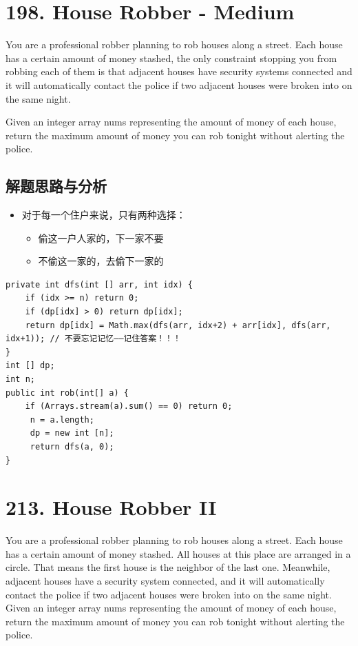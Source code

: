 \documentclass[9pt, b5paaper]{book}
\begin{document}
\section{198. House Robber - Medium}
\label{sec-2-2}
You are a professional robber planning to rob houses along a street. Each house has a certain amount of money stashed, the only constraint stopping you from robbing each of them is that adjacent houses have security systems connected and it will automatically contact the police if two adjacent houses were broken into on the same night.

Given an integer array nums representing the amount of money of each house, return the maximum amount of money you can rob tonight without alerting the police.
\subsection{解题思路与分析}
\label{sec-2-2-1}
\begin{itemize}
\item 对于每一个住户来说，只有两种选择：
\begin{itemize}
\item 偷这一户人家的，下一家不要
\item 不偷这一家的，去偷下一家的
\end{itemize}
\end{itemize}
\begin{verbatim}
private int dfs(int [] arr, int idx) {
    if (idx >= n) return 0;
    if (dp[idx] > 0) return dp[idx];
    return dp[idx] = Math.max(dfs(arr, idx+2) + arr[idx], dfs(arr, idx+1)); // 不要忘记记忆——记住答案！！！
}
int [] dp;
int n;
public int rob(int[] a) {
    if (Arrays.stream(a).sum() == 0) return 0;
     n = a.length;
     dp = new int [n];
     return dfs(a, 0);
}
\end{verbatim}
\section{213. House Robber II}
\label{sec-2-3}
You are a professional robber planning to rob houses along a street. Each house has a certain amount of money stashed. All houses at this place are arranged in a circle. That means the first house is the neighbor of the last one. Meanwhile, adjacent houses have a security system connected, and it will automatically contact the police if two adjacent houses were broken into on the same night.
Given an integer array nums representing the amount of money of each house, return the maximum amount of money you can rob tonight without alerting the police.
\end{document}
